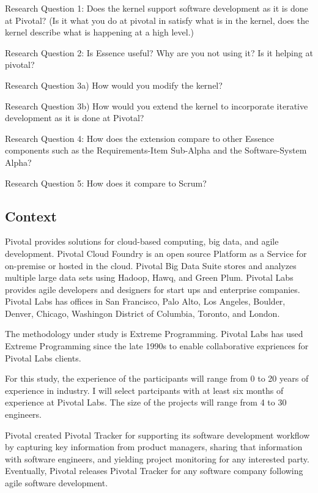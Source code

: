 \documentclass[preprint,12pt,3p]{elsarticle}
\begin{document}
Research Question 1: Does the kernel support software development as it is done at Pivotal? (Is it what you do at pivotal in satisfy what is in the kernel, does the kernel describe what is happening at a high level.)


Research Question 2: Is Essence useful? Why are you not using it? Is it helping at pivotal? 

Research Question 3a) How would you modify the kernel? 

Research Question 3b) How would you extend the kernel to incorporate iterative development as it is done at Pivotal?

Research Question 4: How does the extension compare to other Essence components such as the Requirements-Item Sub-Alpha and the Software-System Alpha? 

Research Question 5: How does it compare to Scrum?


\subsection{Context}
Pivotal provides solutions for cloud-based computing, big data, and agile development. Pivotal Cloud Foundry is an open source Platform as a Service for on-premise or hosted in the cloud. Pivotal Big Data Suite stores and analyzes multiple large data sets using Hadoop, Hawq, and Green Plum. Pivotal Labs provides agile developers and designers for start ups and enterprise companies. Pivotal Labs has offices in San Francisco, Palo Alto, Los Angeles, Boulder, Denver, Chicago, Washingon District of Columbia, Toronto, and London.  

The methodology under study is Extreme Programming. \cite{ExtremeProgrammingExplained} Pivotal Labs has used Extreme Programming since the late 1990s to enable collaborative expriences for Pivotal Labs clients.

For this study, the experience of the participants will range from 0 to 20 years of experience in industry. I will select partcipants with at least six months of experience at Pivotal Labs. The size of the projects will range from 4 to 30 engineers.

Pivotal created Pivotal Tracker for supporting its software development workflow by capturing key information from product managers, sharing that information with software engineers, and yielding project monitoring for any interested party. Eventually, Pivotal releases Pivotal Tracker for any software company following agile software development.
\end{document}
